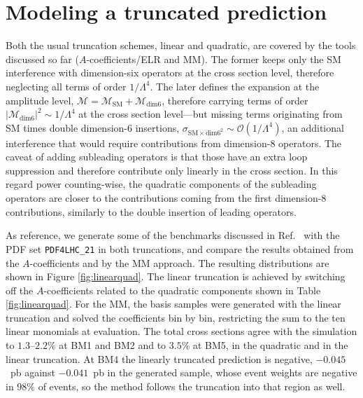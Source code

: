 \section{Modeling a truncated prediction}
\label{sec:trunc_modelling}

Both the usual truncation schemes, linear and quadratic, are covered by the tools discussed so far ($A$-coefficients/ELR and MM). The former keeps only the SM interference with dimension-six operators at the cross section level, therefore neglecting all terms of order $1/\Lambda^4$. The later defines the expansion at the amplitude level, $\mathcal{M}=\mathcal{M}_{\text{SM}}+\mathcal{M}_{\text{dim6}}$, therefore carrying terms of order $|\mathcal{M}_{\text{dim6}}|^2\sim1/\Lambda^4$ at the cross section level---but missing terms originating from SM times double dimension-6 insertions, $\sigma_{\text{SM}\times\text{dim6}^2}\sim\mathcal{O}(1/\Lambda^4)$, an additional interference that would require contributions from dimension-8 operators. The caveat of adding subleading operators is that those have an extra loop suppression and therefore contribute only linearly in the cross section. In this regard power counting-wise, the quadratic components of the subleading operators are closer to the contributions coming from the first dimension-8 contributions, similarly to the double insertion of leading operators. 

As reference, we generate some of the benchmarks discussed in Ref.~\cite{Bär:2965348} with the PDF set \texttt{PDF4LHC\_21} in both truncations, and compare the results obtained from the $A$-coefficients and by the MM approach. The resulting distributions are shown in Figure \ref{fig:linearquad}. The linear truncation is achieved by switching off the $A$-coefficients related to the quadratic components shown in Table \ref{fig:linearquad}. For the MM, the basis samples were generated with the linear truncation and solved the coefficients bin by bin, restricting the sum to the ten linear monomials at evaluation. The total
cross sections agree with the simulation to $1.3$--$2.2\%$ at BM1 and BM2 and to $3.5\%$
at BM5, in the quadratic and in the linear truncation. At BM4 the linearly truncated
prediction is negative, $-0.045$~pb against $-0.041$~pb in the generated sample, whose
event weights are negative in $98\%$ of events, so the method follows the truncation into
that region as well. 



